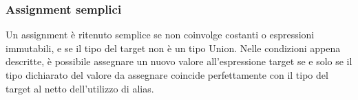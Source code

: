 \subsubsection{Assignment semplici}
Un assignment è ritenuto semplice se non coinvolge costanti o espressioni immutabili, e se
il tipo del target non è un tipo Union. Nelle condizioni appena descritte, è possibile 
assegnare un nuovo valore all'espressione target se e solo se il tipo dichiarato del valore
da assegnare coincide perfettamente con il tipo del target al netto dell'utilizzo di alias.